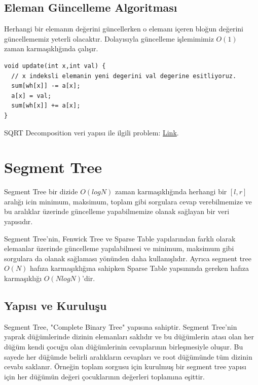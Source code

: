 \documentclass[12pt]{article}
\begin{document}
    \subsection{Eleman G\"{u}ncelleme Algoritmas{\i}}
    
    Herhangi bir eleman{\i}n de\u{g}erini g\"{u}ncellerken o eleman{\i} i\c{c}eren blo\u{g}un de\u{g}erini g\"{u}ncellememiz yeterli olacakt{\i}r. Dolay{\i}s{\i}yla g\"{u}ncelleme i\c{s}lemimimiz $O(1)$ zaman karma\c{s}{\i}kl{\i}\u{g}{\i}nda \c{c}al{\i}\c{s}{\i}r. 
    
    \begin{verbatim}
void update(int x,int val) {
  // x indeksli elemanin yeni degerini val degerine esitliyoruz.
  sum[wh[x]] -= a[x];
  a[x] = val;
  sum[wh[x]] += a[x];
}
    \end{verbatim} 
    
    SQRT Decomposition  veri yap{\i}s{\i} ile ilgili problem: \href{https://codeforces.com/contest/13/problem/E}{Link}.
    \cleardoublepage
    
	\section{Segment Tree}
	
    Segment Tree bir dizide $O(log N)$ zaman karma\c{s}{\i}kl{\i}\u{g}{\i}nda herhangi bir $[l,r]$ aral{\i}\u{g}{\i} icin minimum, maksimum, toplam gibi sorgulara cevap verebilmemize ve bu aral{\i}klar \"{u}zerinde g\"{u}ncelleme yapabilmemize olanak sa\u{g}layan bir veri yap{\i}s{\i}d{\i}r.
    
    Segment Tree'nin, Fenwick Tree ve Sparse Table yap{\i}lar{\i}ndan farkl{\i} olarak elemanlar \"{u}zerinde g\"{u}ncelleme yap{\i}labilmesi ve minimum, maksimum gibi sorgulara da olanak sa\u{g}lamas{\i} y\"{o}n\"{u}nden daha kullan{\i}\c{s}l{\i}d{\i}r. Ayr{\i}ca segment tree $O(N)$ haf{\i}za karma\c{s}{\i}kl{\i}\u{g}{\i}na sahipken Sparse Table yaps{\i}n{\i}nda 
    gereken haf{\i}za karma\c{s}{\i}kl{\i}\u{g}{\i} $O(NlogN)$'dir. 
    
    \subsection {Yap{\i}s{\i} ve Kurulu\c{s}u}
    
    Segment Tree, "Complete Binary Tree" yap{\i}s{\i}na sahiptir. Segment Tree'nin yaprak d\"{u}\u{g}\"{u}mlerinde dizinin elemanlar{\i} sakl{\i}d{\i}r ve bu d\"{u}\u{g}\"{u}mlerin atas{\i} olan her d\"{u}\u{g}\"{u}m kendi \c{c}ocu\u{g}u olan d\"{u}\u{g}\"{u}mlerinin cevaplar{\i}n{\i}n birle\c{s}mesiyle olu\c{s}ur. Bu sayede her d\"{u}\u{g}\"{u}mde belirli aral{\i}klar{\i}n cevaplar{\i} ve root d\"{u}\u{g}\"{u}m\"{u}nde t\"{u}m dizinin cevab{\i} saklan{\i}r. \"{O}rne\u{g}in toplam sorgusu i\c{c}in kurulmu\c{s} bir segment tree yap{\i}s{\i} i\c{c}in her d\"{u}\u{g}\"{u}m\"{u}n de\u{g}eri \c{c}ocuklar{\i}n{\i}n de\u{g}erleri toplam{\i}na e\c{s}ittir.
\end{document}

